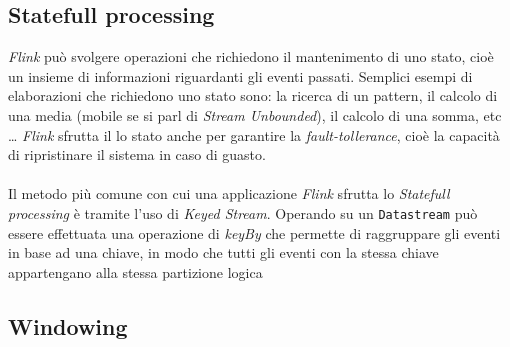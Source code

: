 \subsection{Statefull processing}
\label{subsec:flink_statefull_processing}
\textit{Flink} può svolgere operazioni che richiedono il mantenimento di uno stato, cioè un insieme di informazioni riguardanti gli eventi passati.
Semplici esempi di elaborazioni che richiedono uno stato sono: la ricerca di un pattern, il calcolo di una media (mobile se si parl di \textit{Stream Unbounded}), il calcolo di una somma, etc \dots
\textit{Flink} sfrutta il lo stato anche per garantire la \textit{fault-tollerance}, cioè la capacità di ripristinare il sistema in caso di guasto.\\\\
Il metodo più comune con cui una applicazione \textit{Flink} sfrutta lo \textit{Statefull processing} è tramite l'uso di \textit{Keyed Stream}.
Operando su un \texttt{Datastream} può essere effettuata una operazione di \textit{keyBy} che permette di raggruppare gli eventi in base ad una chiave,
in modo che tutti gli eventi con la stessa chiave appartengano alla stessa partizione logica 


\subsection{Windowing}
\label{subsec:flink_windowing}

